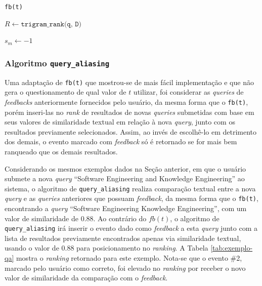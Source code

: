 \documentclass[12pt]{article}
\newcommand{\quotes}[1]{``#1''}
\begin{document}
\begin{algorithm}
\caption{\texttt{fb(t)}}
\label{alg:fbt}
\LinesNumbered
{}
\SetAlgoLined
{}

$R \gets \texttt{trigram\_rank(q, D)}$

$s_m \gets -1$



\end{algorithm}

\subsubsection{Algoritmo \texttt{query\_aliasing}}

Uma adaptação de \texttt{fb(t)} que mostrou-se de mais fácil implementação e que não gera o questionamento de qual valor de $t$ utilizar, foi considerar as \textit{queries} de \textit{feedbacks} anteriormente fornecidos pelo usuário, da mesma forma que o \texttt{fb(t)}, porém inseri-las no \textit{rank} de resultados de novas \textit{queries} submetidas com base em seus valores de similaridade textual em relação à nova \textit{query}, junto com os resultados previamente selecionados. Assim, ao invés de escolhê-lo em detrimento dos demais, o evento marcado com \textit{feedback} só é retornado se for mais bem ranqueado que os demais resultados.

Considerando os mesmos exemplos dados na Seção anterior, em que o usuário submete a nova \textit{query}  \quotes{Software Engineering and Knowledge Engineering} ao sistema, o algoritmo de \texttt{query\_aliasing} realiza comparação textual entre a nova \textit{query} e as \textit{queries} anteriores que possuam \textit{feedback}, da mesma forma que o \texttt{fb(t)}, encontrando a \textit{query} \quotes{Software Engineering Knowledge Engineering}, com um valor de similaridade de $0.88$. Ao contrário do $fb(t)$, o algoritmo de \texttt{query\_aliasing} irá inserir o evento dado como \textit{feedback} a esta \textit{query} junto com a lista de resultados previamente encontrados apenas via similaridade textual, usando o valor de $0.88$ para posicionamento no \textit{ranking}. A Tabela \ref{tab:exemplo-qa} mostra o \textit{ranking} retornado para este exemplo. Nota-se que o evento \#2, marcado pelo usuário como correto, foi elevado no \textit{ranking} por receber o novo valor de similaridade da comparação com o \textit{feedback}.
\end{document}
